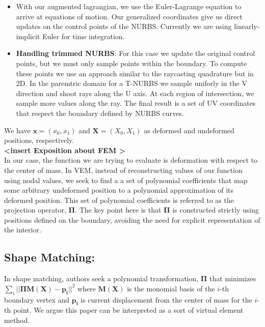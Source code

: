 \documentclass[sigconf]{acmart}
\begin{document}
\begin{itemize}
	\item With our augmented lagrangian, we use the Euler-Lagrange equation to arrive at equations of motion. Our generalized coordinates give us direct updates on the control points of the NURBS. Currently we are using linearly-implicit Euler for time integration.
	\item \textbf{Handling trimmed NURBS}: For this case we update the original control points, but we must only sample points within the boundary. To compute these points we use an approach similar to the raycasting quadrature but in 2D. In the paremtric domain for a T-NURBS we sample uniforly in the V direction and shoot rays along the U axis. At each region of intersection, we sample more values along the ray. The final result is a set of UV coordinates that respect the boundary defined by NURBS curves.
\end{itemize}



We have $\mathbf{x} = (x_0, x_1)$ and $\mathbf{X} = (X_0, X_1) $ as deformed and undeformed positions, respectively. \\

\textbf{<insert Exposition about FEM >} \\
In our case, the function we are trying to evaluate is deformation with respect to the center of mass. In VEM, instead of reconstructing values of our function using nodal values, we seek to find a a set of polynomial coefficients that map some arbitrary undeformed position to a polynomial approximation of its deformed position. This set of polynomial coefficients is referred to as the projection operator, $\mathbf{\Pi}$. The key point here is that $\mathbf{\Pi}$ is constructed strictly using positions defined on the boundary, avoiding the need for explicit representation of the interior. \\

\subsection{Shape Matching: }
In shape matching, authors seek a polynomial transformation, $\mathbf{\Pi}$ that minimizes $\sum_i ||\mathbf{\Pi}\mathbf{M(X)} - \mathbf{p_i}||^2$ where $\mathbf{M(X)}$ is the monomial basis of the $i$-th boundary vertex and $\mathbf{p_i}$ is current displacement from the center of mass for the $i$-th point. We argue this paper can be interpreted as a sort of virtual element method. \\
\end{document}
